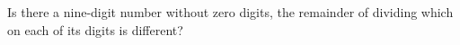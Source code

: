 Is there a nine-digit number without zero digits, the remainder of dividing which on each of its digits is different?